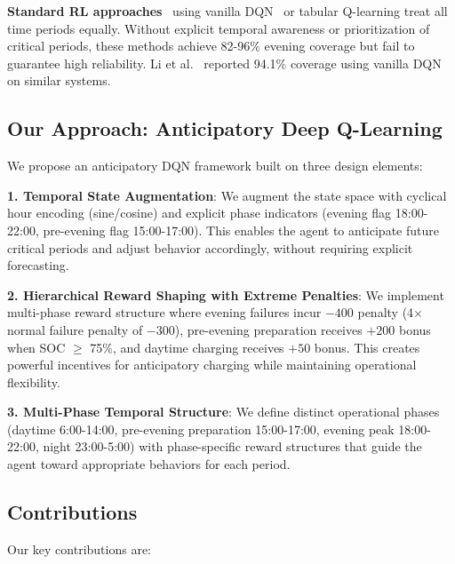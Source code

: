 \documentclass[11pt,a4paper]{article}
\begin{document}
\textbf{Standard RL approaches}~\cite{kuznetsova2013,li2020} using vanilla DQN~\cite{mnih2015} or tabular Q-learning treat all time periods equally. Without explicit temporal awareness or prioritization of critical periods, these methods achieve 82-96\% evening coverage but fail to guarantee high reliability. Li et al.~\cite{li2020} reported 94.1\% coverage using vanilla DQN on similar systems.

\subsection{Our Approach: Anticipatory Deep Q-Learning}

We propose an anticipatory DQN framework built on three design elements:

\textbf{1. Temporal State Augmentation}: We augment the state space with cyclical hour encoding (sine/cosine) and explicit phase indicators (evening flag 18:00-22:00, pre-evening flag 15:00-17:00). This enables the agent to anticipate future critical periods and adjust behavior accordingly, without requiring explicit forecasting.

\textbf{2. Hierarchical Reward Shaping with Extreme Penalties}: We implement multi-phase reward structure where evening failures incur $-400$ penalty (4$\times$ normal failure penalty of $-300$), pre-evening preparation receives $+200$ bonus when SOC $\geq$ 75\%, and daytime charging receives $+50$ bonus. This creates powerful incentives for anticipatory charging while maintaining operational flexibility.

\textbf{3. Multi-Phase Temporal Structure}: We define distinct operational phases (daytime 6:00-14:00, pre-evening preparation 15:00-17:00, evening peak 18:00-22:00, night 23:00-5:00) with phase-specific reward structures that guide the agent toward appropriate behaviors for each period.

\subsection{Contributions}

Our key contributions are:
\end{document}
